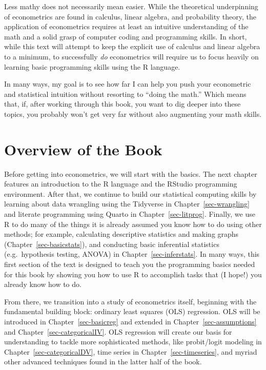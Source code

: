 \documentclass[
  letterpaper,
]{book}
\begin{document}
Less mathy does not necessarily mean easier. While the theoretical
underpinning of econometrics are found in calculus, linear algebra, and
probability theory, the application of econometrics requires at least an
intuitive understanding of the math and a solid grasp of computer coding
and programming skills. In short, while this text will attempt to keep
the explicit use of calculus and linear algebra to a minimum, to
successfully \emph{do} econometrics will require us to focus heavily on
learning basic programming skills using the R language.

In many ways, my goal is to see how far I can help you push your
econometric and statistical intuition without resorting to ``doing the
math.'' Which means that, if, after working through this book, you want
to dig deeper into these topics, you probably won't get very far without
also augmenting your math skills.

\section{Overview of the Book}\label{overview-of-the-book}

Before getting into econometrics, we will start with the basics. The
next chapter features an introduction to the R language and the RStudio
programming environment. After that, we continue to build our
statistical computing skills by learning about data wrangling using the
Tidyverse in Chapter~\ref{sec-wrangling} and literate programming using
Quarto in Chapter~\ref{sec-litprog}. Finally, we use R to do many of the
things it is already assumed you know how to do using other methods; for
example, calculating descriptive statistics and making graphs
(Chapter~\ref{sec-basicstats}), and conducting basic inferential
statistics (e.g.~hypothesis testing, ANOVA) in
Chapter~\ref{sec-inferstats}. In many ways, this first section of the
text is designed to teach you the programming basics needed for this
book by showing you how to use R to accomplish tasks that (I hope!) you
already know how to do.

From there, we transition into a study of econometrics itself, beginning
with the fundamental building block: ordinary least squares (OLS)
regression. OLS will be introduced in Chapter~\ref{sec-basicreg} and
extended in Chapter~\ref{sec-assumptions} and
Chapter~\ref{sec-categoricalIV}. OLS regression will create our basis
for understanding to tackle more sophisticated methods, like
probit/logit modeling in Chapter~\ref{sec-categoricalDV}, time series in
Chapter~\ref{sec-timeseries}, and myriad other advanced techniques found
in the latter half of the book.
\end{document}
